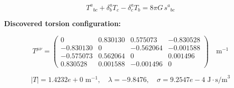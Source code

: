 
\begin{equation}
  T^a{}_{bc} + \delta^a_b T_c - \delta^a_c T_b = 8\pi G \, s^a{}_{bc}
\end{equation}

\textbf{Discovered torsion configuration:}

\begin{equation}
  T^{\mu\nu} = \begin{pmatrix}
    0 & 0.830130 & 0.575073 & -0.830528 \\
    -0.830130 & 0 & -0.562064 & -0.001588 \\
    -0.575073 & 0.562064 & 0 & 0.001496 \\
    0.830528 & 0.001588 & -0.001496 & 0
  \end{pmatrix} \quad \text{m}^{-1}
\end{equation}

\begin{equation}
  |T| = 1.4232e+0 \text{ m}^{-1}, \quad
  \lambda = -9.8476, \quad
  \sigma = 9.2547e-4 \text{ J}\cdot\text{s/m}^3
\end{equation}